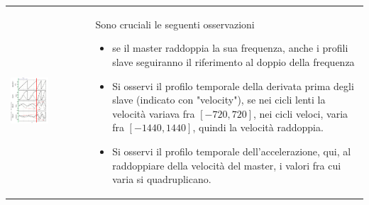 \documentclass[10pt, letterpaper]{report}
\begin{document}
\begin{center}
	\begin{tabular}{>{\centering\arraybackslash}m{3in}>{\arraybackslash}m{3in}}
        \includegraphics[width=0.5\textwidth]{images/cambioVel2.png} & 
        Sono cruciali le seguenti osservazioni\begin{itemize}
            \item se il master raddoppia la sua frequenza, anche i profili slave seguiranno il riferimento al doppio della frequenza 
            \item Si osservi il profilo temporale della derivata prima degli slave (indicato con "velocity"), se nei cicli lenti la velocità variava fra $[-720,720]$, nei cicli veloci, varia fra $[-1440,1440]$, quindi la velocità raddoppia.
            \item Si osservi il profilo temporale dell'accelerazione, qui, al raddoppiare della velocità del master, i valori fra cui varia si quadruplicano.
        \end{itemize}
		\\
	\end{tabular}
\end{center}
\end{document}
